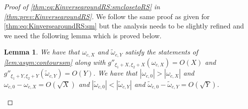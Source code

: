 \documentclass[11pt,twoside]{amsart}
\theoremstyle{plain}
\newtheorem{lem}[thm]{Lemma}
\numberwithin{quest}{section}
\theoremstyle{remark}
\numberwithin{rem}{section}
\theoremstyle{definition}
\begin{document}
	\begin{proof}[Proof of \eqref{thm:eq:KinversearoundRS:smclosetoRS} in \cref{thm:prev:KinversearoundRS}]
		We follow the same proof as given for \eqref{thm:eq:KinversearoundRS:sm} but the analysis needs to be slightly refined and we need  the following lemma which is proved below.
		
		\begin{lem}\label{lem:asym:secondderclosesm}
			We have that $\omega_{c,X}$ and $\tilde{\omega}_{c,Y}$ satisfy the statements of \cref{lem:asym:contourssm} along with $g''_{\xi_1+X,\xi_2+X}(\omega_{c,X})=O(X)$ and $g''_{\xi_1+Y,\xi_2+Y}(\tilde{\omega}_{c,Y})=O(Y)$.  We have that $|\omega_{c,0}|>|\omega_{c,X}|$ and $\omega_{c,0}-\omega_{c,X}=O(\sqrt{X})$ and 
			$|\tilde{\omega}_{c,0}|<|\tilde{\omega}_{c,Y}|$ and $\tilde{\omega}_{c,0}-\tilde{\omega}_{c,Y}=O(\sqrt{Y})$.
		\end{lem}

	

        
		

\end{proof}
\end{document}
